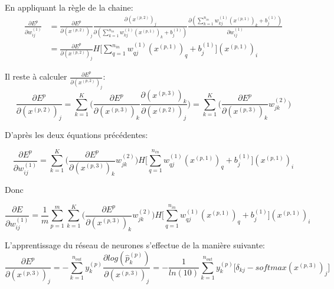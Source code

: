 \documentclass[a4paper,11pt,oneside,roman]{article}
\begin{document}
    En appliquant la règle de la chaine:
    \begin{equation}
        \begin{aligned}
            \frac{\partial E^p}{\partial w_{ij}^{(1)}} & = \frac{\partial E^p}{\partial (x^{(p,2)})_j} \frac{\partial (x^{(p,2)})_j}{\partial (\sum\limits_{k=1}^{n_{in}} w_{kj}^{(1)}(x^{(p,1)})_{k} + b_j^{(1)})} \frac{\partial (\sum\limits_{k=1}^{n_{in}} w_{kj}^{(1)}(x^{(p,1)})_{k} + b_j^{(1)})}{\partial w_{ij}^{(1)}} \\
            & = \frac{\partial E^p}{\partial (x^{(p,2)})_j} H\big[\sum\limits_{q=1}^{n_{in}} w_{qj}^{(1)}(x^{(p,1)})_{q} + b_j^{(1)}\big] (x^{(p,1)})_i
        \end{aligned}
    \end{equation}

    Il reste à calculer $\frac{\partial E^p}{\partial (x^{(p,2)})_j}$:
    \begin{equation}
        \frac{\partial E^p}{\partial (x^{(p,2)})_j}  = \sum\limits_{k=1}^{K} \Big(\frac{\partial E^p}{\partial (x^{(p,3)})_k} \frac{\partial (x^{(p,3)})_k}{\partial (x^{(p,2)})_j}\Big) = \sum\limits_{k=1}^{K} \Big(\frac{\partial E^p}{\partial (x^{(p,3)})_k} w_{jk}^{(2)}\Big)
    \end{equation}

    D'après les deux équations précédentes:

    \begin{equation}
        \frac{\partial E^p}{\partial w_{ij}^{(1)}} = \sum\limits_{k=1}^{K} \Big(\frac{\partial E^p}{\partial (x^{(p,3)})_k} w_{jk}^{(2)}\Big) H\big[\sum\limits_{q=1}^{n_{in}} w_{qj}^{(1)}(x^{(p,1)})_{q} + b_j^{(1)}\big] (x^{(p,1)})_i
    \end{equation}

    Donc

    \begin{equation}
        \frac{\partial E}{\partial w_{ij}^{(1)}} = \frac{1}{m}\sum\limits_{p=1}^{m}\sum\limits_{k=1}^{K} \Big(\frac{\partial E^p}{\partial (x^{(p,3)})_k} w_{jk}^{(2)}\Big) H\big[\sum\limits_{q=1}^{n_{in}} w_{qj}^{(1)}(x^{(p,1)})_{q} + b_j^{(1)}\big] (x^{(p,1)})_i
        \label{backprop}
    \end{equation}

    L'apprentissage du réseau de neurones s'effectue de la manière suivante:
    \begin{equation}
        \frac{\partial E^p}{\partial (x^{(p,3)})_{j}} = -\sum\limits_{k=1}^{n_{out}} y_k^{(p)} \frac{\partial log(\hat{p}_{k}^{(p)})}{\partial (x^{(p,3)})_{j}} = - \frac{1}{ln(10)} \sum\limits_{k=1}^{n_{out}} y_k^{(p)} \bigg[ \delta_{kj} - softmax(x^{(p,3)})_j \bigg]
    \end{equation}
\end{document}
